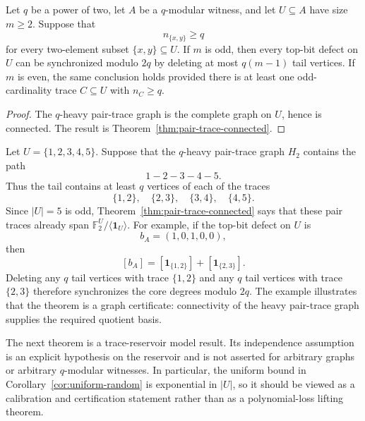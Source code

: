 \documentclass[thmsec,dntnbr,nolinenbrs]{dmgt}
\numberwithin{equation}{section}
\newcommand{\F}{\mathbb{F}}
\newcommand{\one}{\mathbf{1}}
\begin{document}
\begin{corollary}\label{cor:complete-pair-trace}
Let \(q\) be a power of two, let \(A\) be a \(q\)-modular witness, and let \(U\subseteq A\) have size \(m\ge 2\).  Suppose that
\[
        n_{\{x,y\}}\ge q
\]
for every two-element subset \(\{x,y\}\subseteq U\).  If \(m\) is odd, then every top-bit defect on \(U\) can be synchronized modulo \(2q\) by deleting at most \(q(m-1)\) tail vertices.  If \(m\) is even, the same conclusion holds provided there is at least one odd-cardinality trace \(C\subseteq U\) with \(n_C\ge q\).
\end{corollary}

\begin{proof}
The \(q\)-heavy pair-trace graph is the complete graph on \(U\), hence is connected.  The result is Theorem~\ref{thm:pair-trace-connected}.
\end{proof}

\begin{example}\label{ex:pair-trace-path}\mbox{}\par\nobreak
Let \(U=\{1,2,3,4,5\}\).  Suppose that the \(q\)-heavy pair-trace graph \(H_2\) contains the path
\[
        1\!-\!2\!-\!3\!-\!4\!-\!5.
\]
Thus the tail contains at least \(q\) vertices of each of the traces
\[
        \{1,2\},\quad \{2,3\},\quad \{3,4\},\quad \{4,5\}.
\]
Since \(|U|=5\) is odd, Theorem~\ref{thm:pair-trace-connected} says that these pair traces already span \(\F_2^U/\langle\one_U\rangle\).  For example, if the top-bit defect on \(U\) is
\[
        b_A=(1,0,1,0,0),
\]
then
\[
        [b_A]=[\one_{\{1,2\}}]+[\one_{\{2,3\}}].
\]
Deleting any \(q\) tail vertices with trace \(\{1,2\}\) and any \(q\) tail vertices with trace \(\{2,3\}\) therefore synchronizes the core degrees modulo \(2q\).  The example illustrates that the theorem is a graph certificate: connectivity of the heavy pair-trace graph supplies the required quotient basis.
\end{example}

The next theorem is a trace-reservoir model result.  Its independence assumption is an explicit hypothesis on the reservoir and is not asserted for arbitrary graphs or arbitrary \(q\)-modular witnesses.  In particular, the uniform bound in Corollary~\ref{cor:uniform-random} is exponential in \(|U|\), so it should be viewed as a calibration and certification statement rather than as a polynomial-loss lifting theorem.
\end{document}
